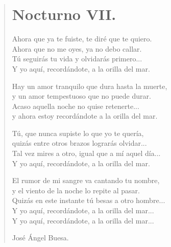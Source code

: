 \documentclass[11pt, portrait, twoside, notitlepage, openright]{book}
\begin{document}
\newpage
\begin{verse}
\begin{center}
\section{Nocturno VII.}
\end{center}
Ahora que ya te fuiste, te diré que te quiero.\\
Ahora que no me oyes, ya no debo callar.\\
Tú seguirás tu vida y olvidarás primero...\\
Y yo aquí, recordándote, a la orilla del mar.
\newline
 
Hay un amor tranquilo que dura hasta la muerte,\\
y un amor tempestuoso que no puede durar.\\
Acaso aquella noche no quise retenerte...\\
y ahora estoy recordándote a la orilla del mar.
\newline

Tú, que nunca supiste lo que yo te quería,\\
quizás entre otros brazos lograrás olvidar...\\
Tal vez mires a otro, igual que a mí aquel día...\\
Y yo aquí, recordándote, a la orilla del mar.
\newline

El rumor de mi sangre va cantando tu nombre,\\
y el viento de la noche lo repite al pasar.\\
Quizás en este instante tú besas a otro hombre...\\
Y yo aquí, recordándote, a la orilla del mar...\\
Y yo aquí, recordándote, a la orilla del mar...
\newline

José Ángel Buesa.
\end{verse}
\end{document}
